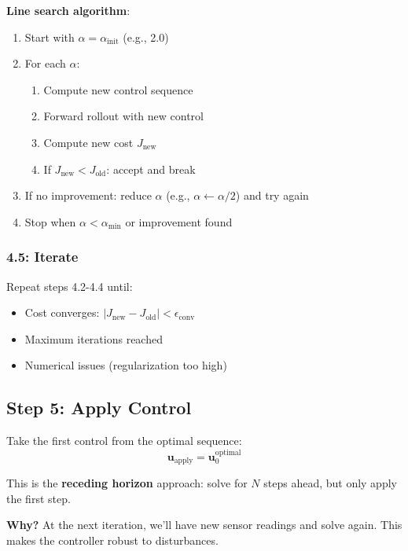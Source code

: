\documentclass[11pt,a4paper]{article}
\begin{document}
\textbf{Line search algorithm}:
\begin{enumerate}
    \item Start with $\alpha = \alpha_{\text{init}}$ (e.g., 2.0)
    \item For each $\alpha$:
    \begin{enumerate}
        \item Compute new control sequence
        \item Forward rollout with new control
        \item Compute new cost $J_{\text{new}}$
        \item If $J_{\text{new}} < J_{\text{old}}$: accept and break
    \end{enumerate}
    \item If no improvement: reduce $\alpha$ (e.g., $\alpha \leftarrow \alpha/2$) and try again
    \item Stop when $\alpha < \alpha_{\min}$ or improvement found
\end{enumerate}

\subsubsection{4.5: Iterate}

Repeat steps 4.2-4.4 until:
\begin{itemize}
    \item Cost converges: $|J_{\text{new}} - J_{\text{old}}| < \epsilon_{\text{conv}}$
    \item Maximum iterations reached
    \item Numerical issues (regularization too high)
\end{itemize}

\subsection{Step 5: Apply Control}

Take the first control from the optimal sequence:
\begin{equation}
\mathbf{u}_{\text{apply}} = \mathbf{u}_0^{\text{optimal}}
\end{equation}

This is the \textbf{receding horizon} approach: solve for $N$ steps ahead, but only apply the first step.

\textbf{Why?} At the next iteration, we'll have new sensor readings and solve again. This makes the controller robust to disturbances.
\end{document}
